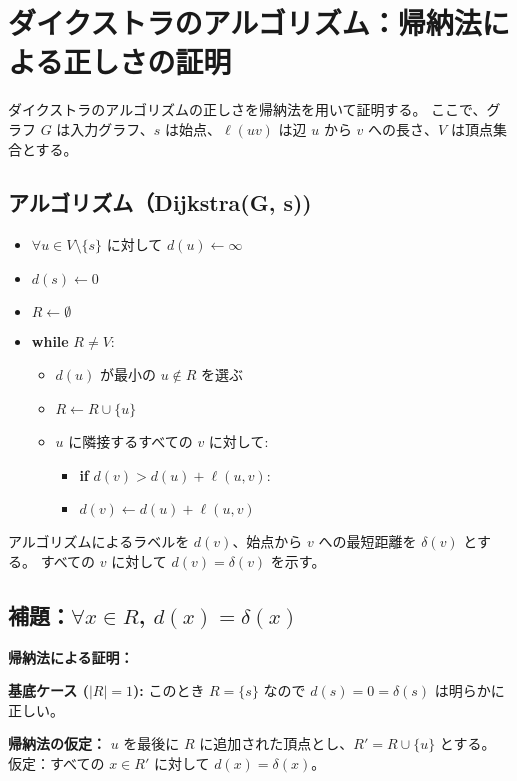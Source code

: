 \documentclass{article}
\begin{document}
\section*{ダイクストラのアルゴリズム：帰納法による正しさの証明}

ダイクストラのアルゴリズムの正しさを帰納法を用いて証明する。  
ここで、グラフ $G$ は入力グラフ、$s$ は始点、$\ell(uv)$ は辺 $u$ から $v$ への長さ、$V$ は頂点集合とする。

\subsection*{アルゴリズム（Dijkstra(G, s))}

\begin{itemize}
  \item $\forall u \in V \setminus \{s\}$ に対して $d(u) \gets \infty$
  \item $d(s) \gets 0$
  \item $R \gets \emptyset$
  \item \textbf{while} $R \neq V$:
  \begin{itemize}
    \item $d(u)$ が最小の $u \notin R$ を選ぶ
    \item $R \gets R \cup \{u\}$
    \item $u$ に隣接するすべての $v$ に対して:
    \begin{itemize}
      \item \textbf{if} $d(v) > d(u) + \ell(u, v)$:
      \item \quad $d(v) \gets d(u) + \ell(u, v)$
    \end{itemize}
  \end{itemize}
\end{itemize}

アルゴリズムによるラベルを $d(v)$、始点から $v$ への最短距離を $\delta(v)$ とする。  
すべての $v$ に対して $d(v) = \delta(v)$ を示す。

\subsection*{補題：$\forall x \in R$, $d(x) = \delta(x)$}

\textbf{帰納法による証明：}

\textbf{基底ケース ($|R| = 1$):}  
このとき $R = \{s\}$ なので $d(s) = 0 = \delta(s)$ は明らかに正しい。

\textbf{帰納法の仮定：}  
$u$ を最後に $R$ に追加された頂点とし、$R' = R \cup \{u\}$ とする。  
仮定：すべての $x \in R'$ に対して $d(x) = \delta(x)$。
\end{document}

